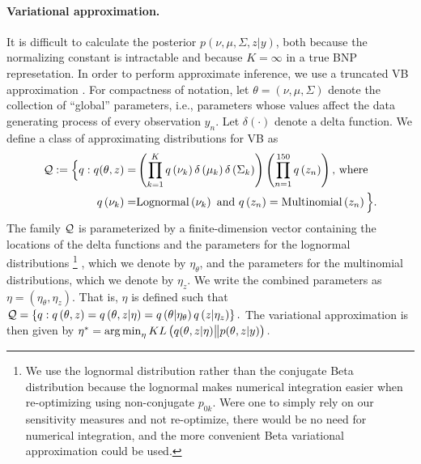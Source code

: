%
\paragraph{Variational approximation.}
It is difficult to calculate the posterior $p\left(\nu, \mu, \Sigma, z \vert
y\right)$, both because the normalizing constant is intractable and because
$K=\infty$ in a true BNP represetation. In order to perform approximate
inference, we use a truncated VB approximation
\citep{blei:2006:dirichletbnp}. For compactness of notation, let $\theta =
\left(\nu, \mu, \Sigma\right)$ denote the collection of ``global'' parameters,
i.e., parameters whose values affect the data generating process of every
observation $y_n$.   Let $\delta\left(\cdot\right)$ denote a delta function. We
define a class of approximating distributions for VB as
%
\begin{align*}
\mathcal{Q} := \Big\{ q:
q(\theta, z) = &
\left(\prod_{k=1}^{K}q\left(\nu_{k}\right)\delta\left(\mu_{k}\right)
    \delta\left(\Sigma_{k}\right)\right)
    \left(\prod_{n=1}^{150}q\left(z_{n}\right) \right)\textrm{, where } \\
q\left(\nu_{k}\right) =& \mathrm{Lognormal}\left(\nu_k\right) \textrm{ and }
q\left(z_n\right) = \mathrm{Multinomial}\left(z_n\right)
\Big\}.
\end{align*}
%
The family $\mathcal{Q}$ is parameterized by a finite-dimension vector containing
the locations of the delta functions and the parameters for the lognormal
distributions
%
\footnote{We use the lognormal distribution rather than the conjugate Beta
distribution because the lognormal makes numerical integration easier when
re-optimizing using non-conjugate $p_{0k}$.  Were one to simply rely on our
sensitivity measures and not re-optimize, there would be no need for numerical
integration, and the more convenient Beta variational approximation could be
used.}
%
, which we denote by $\eta_\theta$, and the parameters for the
multinomial distributions, which we denote by $\eta_z$. We write the combined
parameters as $\eta=\left(\eta_\theta, \eta_z\right)$. That is, $\eta$ is
defined such that
%
$\mathcal{Q} =
    \left\{q: q\left(\theta, z\right) =
            q\left(\theta, z \vert \eta \right) =
            q\left(\theta \vert \eta_\theta \right)
            q\left(z \vert \eta_z \right)
    \right\}.$
%
The variational approximation is then given by
%
$
\etaopt = \argmin_{\eta} KL\left(
    q(\theta, z \vert \eta) \big\| p(\theta, z | y)
    \right). %
$
%

